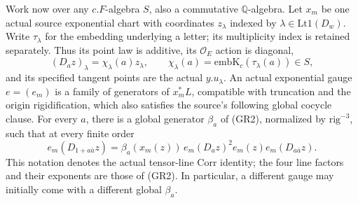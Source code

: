 Work now over any \(c.F\)-algebra \(S\), also a
commutative \(\mathbb Q\)-algebra.
Let \(x_m\) be one actual source exponential chart with
coordinates \(z_\lambda\) indexed by
\(\lambda\in\mathrm{Lt1}(D_w)\).
Write \(\tau_\lambda\) for the embedding underlying a
letter; its multiplicity index is retained separately.
Thus its point law is additive, its \(\mathcal O_E\)
action is diagonal,
\[
                    (D_a z)_\lambda=\chi_\lambda(a)z_\lambda,
 \qquad
 \chi_\lambda(a)=\mathrm{embK}_c(\tau_\lambda(a))\in S,             \tag{GR3}
\]
and its specified tangent points are the actual \(y.u_\lambda\).
An actual exponential gauge \(e=(e_m)\) is a family of
generators of \(x_m^*L\), compatible with truncation and
the origin rigidification, which also satisfies the
source's following global cocycle clause.
For every \(a\), there is a global generator
\(\beta_a\) of (GR2), normalized by
\(\mathrm{rig}^{-3}\), such that at every finite order
\[
 e_m(D_{1+a\bar a}z)
   =\beta_a(x_m(z))\,
            e_m(D_a z)^2 e_m(z)e_m(D_{a\bar a}z).            \tag{GR4}
\]
This notation denotes the actual tensor-line
\(\mathrm{Corr}\) identity; the four line factors and
their exponents are those of (GR2).
In particular, a different gauge may initially come
with a different global \(\beta_a\).

